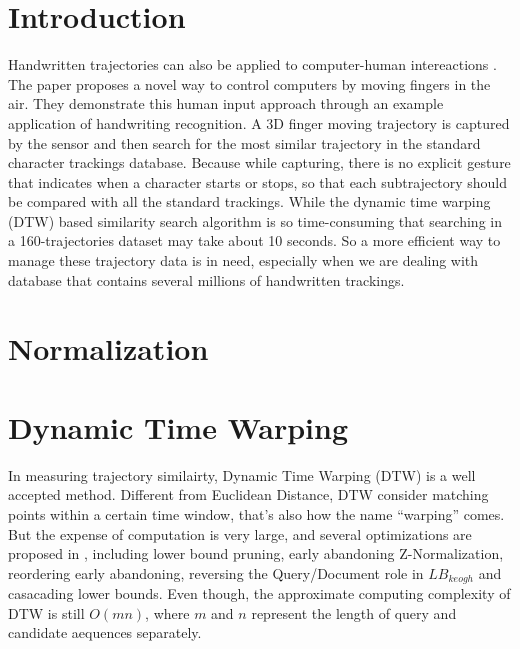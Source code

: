 \documentclass[sigconf]{acmart}
\begin{document}



\maketitle

\section{Introduction}
Handwritten trajectories can also be applied to computer-human intereactions \cite{VikramLR13}. The paper proposes a novel way to control computers by moving fingers in the air. They demonstrate this human input approach through an example application of handwriting recognition. A 3D finger moving trajectory is captured by the sensor and then search for the most similar trajectory in the standard character trackings database. Because while capturing, there is no explicit gesture that indicates when a character starts or stops, so that each subtrajectory should be compared with all the standard trackings.  While the dynamic time warping (DTW)  based similarity search algorithm is so time-consuming  that searching in a 160-trajectories dataset may take about 10 seconds. So a more efficient way to manage these trajectory data is in need, especially when we are dealing with database that contains several millions of handwritten trackings. 






\section{Normalization}



\section{Dynamic Time Warping}
In measuring trajectory similairty, Dynamic Time Warping (DTW) is a well accepted method. Different from Euclidean Distance, DTW consider matching points within a certain time window, that's also how the name ``warping'' comes. But the expense of computation is very large, and several optimizations are proposed in \cite{RakthanmanonDTW, vldb/LB_keogh}, including lower bound pruning, early abandoning Z-Normalization, reordering early abandoning, reversing the Query/Document role in $LB_{keogh}$ and casacading lower bounds. Even though, the approximate computing complexity of DTW is still $O(mn)$, where $m$ and $n$ represent the length of query and candidate aequences separately. 
\end{document}
